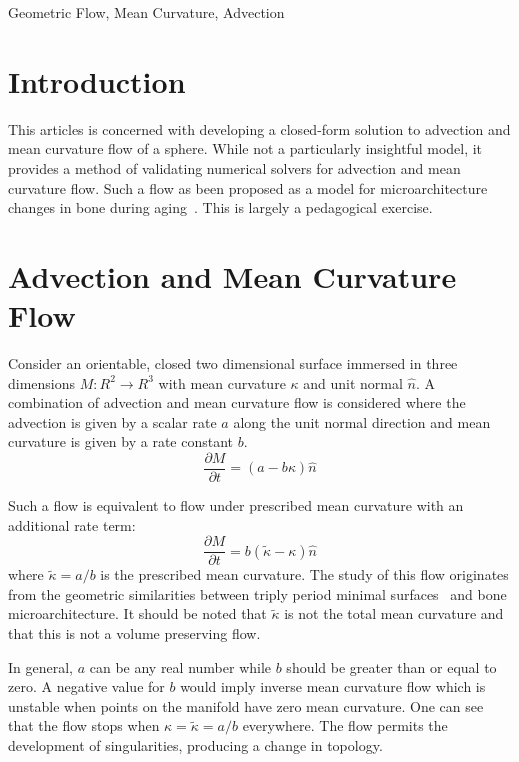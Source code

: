 \documentclass[journal]{IEEEtran}
\begin{document}
\begin{IEEEkeywords}
Geometric Flow, Mean Curvature, Advection
\end{IEEEkeywords}

\section{Introduction}
This articles is concerned with developing a closed-form solution to advection and mean curvature flow of a sphere.
While not a particularly insightful model, it provides a method of validating numerical solvers for advection and mean curvature flow.
Such a flow as been proposed as a model for microarchitecture changes in bone  during aging~\cite{besler2018bone}.
This is largely a pedagogical exercise.

\section{Advection and Mean Curvature Flow}
Consider an orientable, closed two dimensional surface immersed in three dimensions $M \colon \!R^2 \rightarrow \!R^3$ with mean curvature $\kappa$ and unit normal $\hat{n}$.
A combination of advection and mean curvature flow is considered where the advection is given by a scalar rate $a$ along the unit normal direction and mean curvature is given by a rate constant $b$.
\begin{equation}
  \label{eqn:advection-mean}
  \frac{\partial M}{\partial t} = (a - b \kappa) \hat{n}
\end{equation}

Such a flow is equivalent to flow under prescribed mean curvature with an additional rate term:
\begin{equation}
  \frac{\partial M}{\partial t} = b(\tilde{\kappa} - \kappa) \hat{n}
\end{equation}
where $\tilde{\kappa} = a/b$ is the prescribed mean curvature.
The study of this flow originates from the geometric similarities between triply period minimal surfaces~\cite{schoen1970infinite,anderson1987periodic,chopp1993flow} and bone microarchitecture.
It should be noted that $\tilde{\kappa}$ is not the total mean curvature and that this is not a volume preserving flow.

In general, $a$ can be any real number while $b$ should be greater than or equal to zero.
A negative value for $b$ would imply inverse mean curvature flow which is unstable when points on the manifold have zero mean curvature.
One can see that the flow stops when $\kappa = \tilde{\kappa} = a/b$ everywhere.
The flow permits the development of singularities, producing a change in topology.
\end{document}
